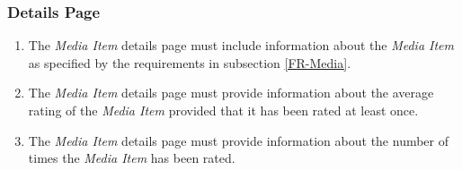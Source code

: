 \subsubsection {Details Page}

\begin{enumerate}[label=\textbf{FR-\twodigits*}, resume]
	\item The \textit{Media Item} details page must include information about the \textit{Media Item} as specified by the requirements in subsection \ref{FR-Media}.
	\item The \textit{Media Item} details page must provide information about the average rating of the \textit{Media Item} provided that it has been rated at least once.
	\item The \textit{Media Item} details page must provide information about the number of times the \textit{Media Item} has been rated.
\end{enumerate}
			
%